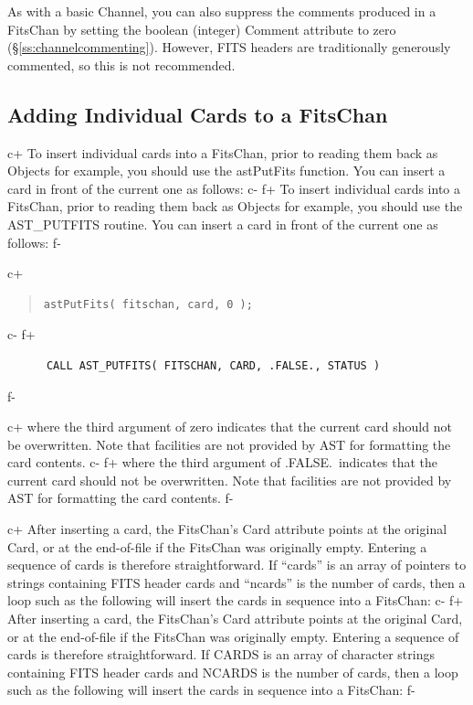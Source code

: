 \documentclass[twoside,11pt]{article}
\newcommand{\secref}[1]{\S\ref{#1}}
\newcommand{\secref}[1]{\ref{#1}}
\begin{document}
As with a basic Channel, you can also suppress the comments produced
in a FitsChan by setting the boolean (integer) Comment attribute to
zero (\secref{ss:channelcommenting}). However, FITS headers are
traditionally generously commented, so this is not recommended.

\subsection{\label{ss:addingfitscards}Adding Individual Cards to a FitsChan}

c+
To insert individual cards into a FitsChan, prior to reading them back
as Objects for example, you should use the astPutFits function. You
can insert a card in front of the current one as follows:
c-
f+
To insert individual cards into a FitsChan, prior to reading them back
as Objects for example, you should use the AST\_PUTFITS routine. You
can insert a card in front of the current one as follows:
f-

c+
\begin{quote}
\small
\begin{verbatim}
astPutFits( fitschan, card, 0 );
\end{verbatim}
\normalsize
\end{quote}
c-
f+
\small
\begin{verbatim}
      CALL AST_PUTFITS( FITSCHAN, CARD, .FALSE., STATUS )
\end{verbatim}
\normalsize
f-

c+
where the third argument of zero indicates that the current card
should not be overwritten. Note that facilities are not provided by
AST for formatting the card contents.
c-
f+
where the third argument of .FALSE.\ indicates that the current card
should not be overwritten. Note that facilities are not provided by
AST for formatting the card contents.
f-

c+
After inserting a card, the FitsChan's Card attribute points at the
original Card, or at the end-of-file if the FitsChan was originally
empty. Entering a sequence of cards is therefore straightforward. If
``cards'' is an array of pointers to strings containing FITS header
cards and ``ncards'' is the number of cards, then a loop such as the
following will insert the cards in sequence into a FitsChan:
c-
f+
After inserting a card, the FitsChan's Card attribute points at the
original Card, or at the end-of-file if the FitsChan was originally
empty. Entering a sequence of cards is therefore straightforward. If
CARDS is an array of character strings containing FITS header cards
and NCARDS is the number of cards, then a loop such as the following
will insert the cards in sequence into a FitsChan:
f-
\end{document}
